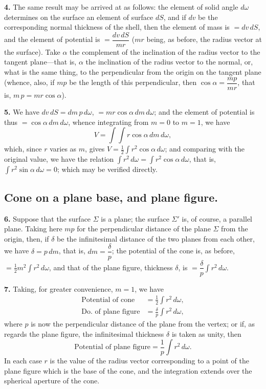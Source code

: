 \documentclass[11pt,a4paper]{article}
\begin{document}
\smallskip\noindent\textbf{4.}\quad
The same result may be arrived at as follows: the element of solid angle
$d\omega$ determines on the surface an element of surface $dS$, and if $dv$
be the corresponding normal thickness of the shell, then the element of mass
is $=dv\,dS$, and the element of potential is $=\dfrac{dv\,dS}{mr}$ ($mr$
being, as before, the radius vector at the surface). Take $\alpha$ the
complement of the inclination of the radius vector to the tangent plane---that
is, $\alpha$ the inclination of the radius vector to the normal, or, what is
the same thing, to the perpendicular from the origin on the tangent plane
(whence, also, if $mp$ be the length of this perpendicular, then
$\cos\alpha = \dfrac{mp}{mr}$, that is, $m\,p = mr\cos\alpha$).

\newpage
\noindent\textbf{5.}\quad
We have $dv\,dS = dm\,p\,d\omega$, $= mr\cos\alpha\,dm\,d\omega$; and the
element of potential is thus $=\cos\alpha\,dm\,d\omega$, whence integrating
from $m=0$ to $m=1$, we have
\[
V = \int\!\!\int r\cos\alpha\,dm\,d\omega,
\]
which, since $r$ varies as $m$, gives $V = \tfrac{1}{2}\int r^2\cos\alpha\,d\omega$;
and comparing with the original value, we have the relation
$\int r^2\,d\omega = \int r^2\cos\alpha\,d\omega$, that is,
$\int r^2\sin\alpha\,d\omega = 0$; which may be verified directly.

\subsection*{Cone on a plane base, and plane figure.}

\smallskip\noindent\textbf{6.}\quad
Suppose that the surface $\Sigma$ is a plane; the surface $\Sigma'$ is, of
course, a parallel plane. Taking here $mp$ for the perpendicular distance of
the plane $\Sigma$ from the origin, then, if $\delta$ be the infinitesimal
distance of the two planes from each other, we have $\delta = p\,dm$, that
is, $dm = \dfrac{\delta}{p}$; the potential of the cone is, as before,
$= \tfrac{1}{2}m^2 \int r^2\,d\omega$, and that of the plane figure, thickness
$\delta$, is $= \dfrac{\delta}{p} \int r^2\,d\omega$.

\smallskip\noindent\textbf{7.}\quad
Taking, for greater convenience, $m=1$, we have
\begin{align*}
\text{Potential of cone} &= \tfrac{1}{2}\int r^2\,d\omega,\\
\text{Do.\ of plane figure} &= \frac{\delta}{p}\int r^2\,d\omega,
\end{align*}
where $p$ is now the perpendicular distance of the plane from the vertex; or
if, as regards the plane figure, the infinitesimal thickness $\delta$ is
taken as unity, then
\[
\text{Potential of plane figure} = \frac{1}{p}\int r^2\,d\omega.
\]
In each case $r$ is the value of the radius vector corresponding to a point
of the plane figure which is the base of the cone, and the integration
extends over the spherical aperture of the cone.
\end{document}
